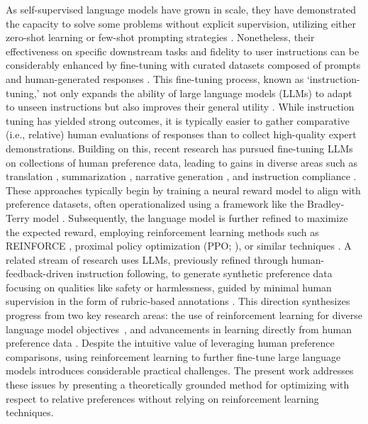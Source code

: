 As self-supervised language models have grown in scale, they have demonstrated the capacity to solve some problems without explicit supervision, utilizing either zero-shot learning \citep{radford2019language} or few-shot prompting strategies \citep{gpt3,megatron,chowdhery2022palm}. Nonetheless, their effectiveness on specific downstream tasks and fidelity to user instructions can be considerably enhanced by fine-tuning with curated datasets composed of prompts and human-generated responses \citep{mishra-etal-2022-cross,sanh2022multitask,chung2022scaling,thoppilan2022lamda}. This fine-tuning process, known as `instruction-tuning,' not only expands the ability of large language models (LLMs) to adapt to unseen instructions but also improves their general utility \citep{chung2022scaling}. While instruction tuning has yielded strong outcomes, it is typically easier to gather comparative (i.e., relative) human evaluations of responses than to collect high-quality expert demonstrations. Building on this, recent research has pursued fine-tuning LLMs on collections of human preference data, leading to gains in diverse areas such as translation \citep{kreutzer-etal-2018-reliability}, summarization \citep{stiennon2022learning,ziegler2020finetuning}, narrative generation \citep{ziegler2020finetuning}, and instruction compliance \citep{ouyang2022training,ramamurthy2023is}. These approaches typically begin by training a neural reward model to align with preference datasets, often operationalized using a framework like the Bradley-Terry model \citep{bradley1952rankanalysis}. Subsequently, the language model is further refined to maximize the expected reward, employing reinforcement learning methods such as REINFORCE \citep{williams1992reinforce}, proximal policy optimization (PPO; \cite{schulman2017proximal}), or similar techniques \citep{ramamurthy2023is}. A related stream of research uses LLMs, previously refined through human-feedback-driven instruction following, to generate synthetic preference data focusing on qualities like safety or harmlessness, guided by minimal human supervision in the form of rubric-based annotations \citep{bai2022constitutional}. This direction synthesizes progress from two key research areas: the use of reinforcement learning for diverse language model objectives~\citep{Ranzato2015SequenceLT,paulus2018a,wu2018learning}, and advancements in learning directly from human preference data \citep{christiano2017deep,kupcsik2018learning}. Despite the intuitive value of leveraging human preference comparisons, using reinforcement learning to further fine-tune large language models introduces considerable practical challenges. The present work addresses these issues by presenting a theoretically grounded method for optimizing with respect to relative preferences without relying on reinforcement learning techniques.

